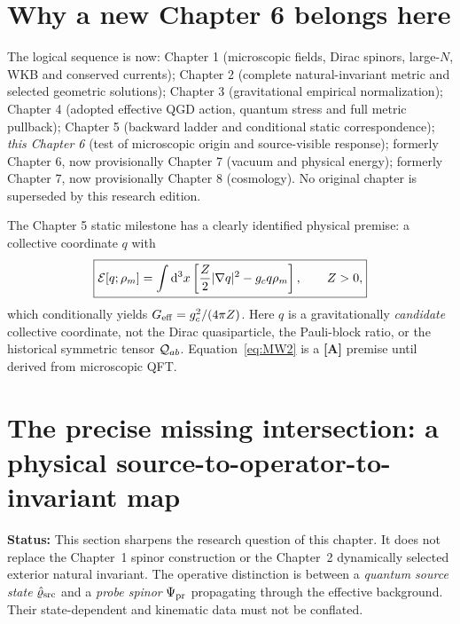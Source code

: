 \documentclass[11pt,a4paper]{article}
\begin{document}
\tableofcontents\newpage
\section{Why a new Chapter 6 belongs here}
The logical sequence is now: Chapter 1 (microscopic fields, Dirac spinors, large-$N$, WKB and conserved currents); Chapter 2 (complete natural-invariant metric and selected geometric solutions); Chapter 3 (gravitational empirical normalization); Chapter 4 (adopted effective QGD action, quantum stress and full metric pullback); Chapter 5 (backward ladder and conditional static correspondence); \emph{this Chapter 6} (test of microscopic origin and source-visible response); formerly Chapter 6, now provisionally Chapter 7 (vacuum and physical energy); formerly Chapter 7, now provisionally Chapter 8 (cosmology). No original chapter is superseded by this research edition.

The Chapter 5 static milestone has a clearly identified physical premise: a collective coordinate $q$ with
\begin{equation}\label{eq:MW2}
\boxed{\mathcal E[q;\rho_m]=\int\mathrm d^3x\left[\frac Z2|\nabla q|^2-g_cq\rho_m\right],\qquad Z>0,}\end{equation}
which conditionally yields $G_{\rm eff}=g_c^2/(4\pi Z)$. Here $q$ is a gravitationally \emph{candidate} collective coordinate, not the Dirac quasiparticle, the Pauli-block ratio, or the historical symmetric tensor $\mathcal Q_{ab}$. Equation~\eqref{eq:MW2} is a \textbf{[A]} premise until derived from microscopic QFT.

\section{The precise missing intersection: a physical source-to-operator-to-invariant map}\label{sec:physicalF}
\textbf{Status:} This section sharpens the research question of this chapter. It does not replace the Chapter~1 spinor construction or the Chapter~2 dynamically selected exterior natural invariant. The operative distinction is between a \emph{quantum source state} $\hat\varrho_{\rm src}$ and a \emph{probe spinor} $\Psi_{\rm pr}$ propagating through the effective background. Their state-dependent and kinematic data must not be conflated.
\end{document}
